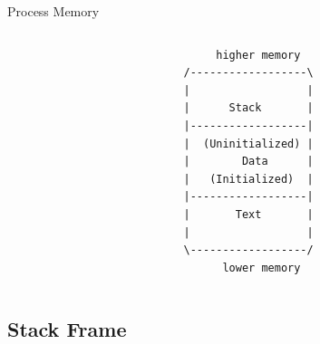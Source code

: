 \begin{frame}{Process Memory}
\begin{columns}[T]
\begin{column}{.6\textwidth}
	\end{column}
	\begin{column}{.4\textwidth}
	\small \begin{verbatim}
       higher memory 
  /------------------\ 
  |                  | 
  |      Stack       | 
  |------------------|
  |  (Uninitialized) |
  |        Data      |
  |   (Initialized)  |
  |------------------|
  |       Text       | 
  |                  | 
  \------------------/ 
        lower memory
\end{verbatim}
\end{column}
\end{columns}
\end{frame}
\subsection{Stack Frame}
